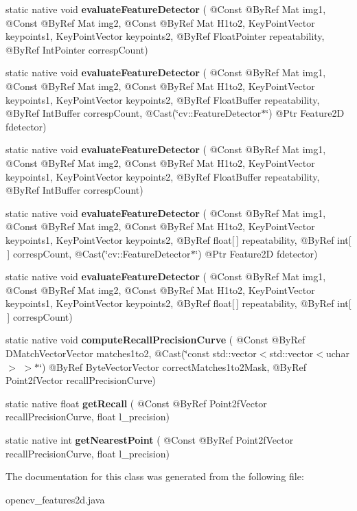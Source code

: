 \begin{DoxyCompactItemize}
\item 
static native void {\bfseries evaluate\+Feature\+Detector} ( @Const @By\+Ref Mat img1, @Const @By\+Ref Mat img2, @Const @By\+Ref Mat H1to2, Key\+Point\+Vector keypoints1, Key\+Point\+Vector keypoints2, @By\+Ref Float\+Pointer repeatability, @By\+Ref Int\+Pointer corresp\+Count)
\item 
static native void {\bfseries evaluate\+Feature\+Detector} ( @Const @By\+Ref Mat img1, @Const @By\+Ref Mat img2, @Const @By\+Ref Mat H1to2, Key\+Point\+Vector keypoints1, Key\+Point\+Vector keypoints2, @By\+Ref Float\+Buffer repeatability, @By\+Ref Int\+Buffer corresp\+Count, @Cast(\char`\"{}cv\+::\+Feature\+Detector$\ast$\char`\"{}) @Ptr Feature2D fdetector)
\item 
static native void {\bfseries evaluate\+Feature\+Detector} ( @Const @By\+Ref Mat img1, @Const @By\+Ref Mat img2, @Const @By\+Ref Mat H1to2, Key\+Point\+Vector keypoints1, Key\+Point\+Vector keypoints2, @By\+Ref Float\+Buffer repeatability, @By\+Ref Int\+Buffer corresp\+Count)
\item 
static native void {\bfseries evaluate\+Feature\+Detector} ( @Const @By\+Ref Mat img1, @Const @By\+Ref Mat img2, @Const @By\+Ref Mat H1to2, Key\+Point\+Vector keypoints1, Key\+Point\+Vector keypoints2, @By\+Ref float\mbox{[}$\,$\mbox{]} repeatability, @By\+Ref int\mbox{[}$\,$\mbox{]} corresp\+Count, @Cast(\char`\"{}cv\+::\+Feature\+Detector$\ast$\char`\"{}) @Ptr Feature2D fdetector)
\item 
static native void {\bfseries evaluate\+Feature\+Detector} ( @Const @By\+Ref Mat img1, @Const @By\+Ref Mat img2, @Const @By\+Ref Mat H1to2, Key\+Point\+Vector keypoints1, Key\+Point\+Vector keypoints2, @By\+Ref float\mbox{[}$\,$\mbox{]} repeatability, @By\+Ref int\mbox{[}$\,$\mbox{]} corresp\+Count)
\item 
static native void {\bfseries compute\+Recall\+Precision\+Curve} ( @Const @By\+Ref D\+Match\+Vector\+Vector matches1to2, @Cast(\char`\"{}const std\+::vector$<$std\+::vector$<$uchar$>$ $>$$\ast$\char`\"{}) @By\+Ref Byte\+Vector\+Vector correct\+Matches1to2\+Mask, @By\+Ref Point2f\+Vector recall\+Precision\+Curve)
\item 
static native float {\bfseries get\+Recall} ( @Const @By\+Ref Point2f\+Vector recall\+Precision\+Curve, float l\+\_\+precision)
\item 
static native int {\bfseries get\+Nearest\+Point} ( @Const @By\+Ref Point2f\+Vector recall\+Precision\+Curve, float l\+\_\+precision)
\end{DoxyCompactItemize}


The documentation for this class was generated from the following file\+:\begin{DoxyCompactItemize}
\item 
opencv\+\_\+features2d.\+java\end{DoxyCompactItemize}
